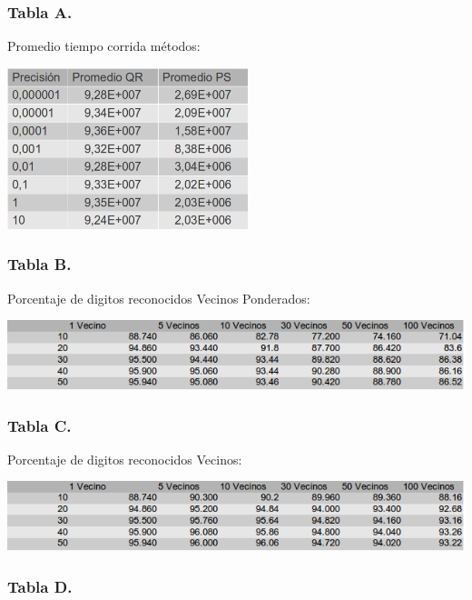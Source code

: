 \subsubsection{Tabla A.}
    
    Promedio tiempo corrida m\'etodos:

    \vspace{5mm}
    \centerline{\includegraphics[width=7cm]{img/tiempoPromedio.png}}
    \vspace{5mm}

\subsubsection{Tabla B.}
    
    Porcentaje de digitos reconocidos Vecinos Ponderados:

    \vspace{5mm}
    \centerline{\includegraphics[width=14cm]{img/kVecinosPonderadosPs.png}}

\subsubsection{Tabla C.}
    
    Porcentaje de digitos reconocidos Vecinos:

    \vspace{5mm}
    \centerline{\includegraphics[width=14cm]{img/kVecinosPs.png}}

\subsubsection{Tabla D.}
    

